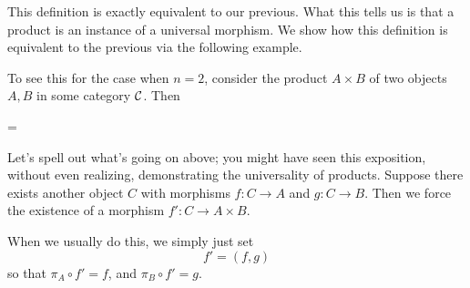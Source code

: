 This definition is exactly equivalent to our previous. What this tells us is that 
a product is an instance of a universal morphism. We show how this definition is equivalent 
to the previous via the following example.

\begin{example}
    To see this for the case when $n = 2$,
    consider the product $A\times B$ of two objects $A, B$ in some category $\mathcal{C}$. 
    Then 
    \begin{center}
        =
        \hspace{1cm}
    \end{center}

    Let's spell out what's going on above; you might have seen this exposition, without even realizing, demonstrating the universality of
    products. Suppose there exists another object $C$ with morphisms
    $f: C \to A$ and $g: C \to B$. Then we force the existence of a
    morphism $f': C \to A \times B$.
    \begin{center}
    \end{center}
    When we usually do this, we simply just set 
    \[
        f' = (f, g)   
    \]
    so that $\pi_A \circ f' = f$, and $\pi_B \circ f' = g$. 
\end{example}


